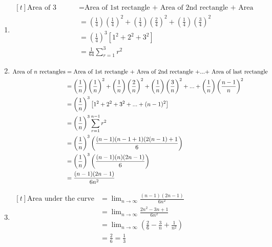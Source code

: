 \documentclass[11pt,a4paper]{book}
\begin{document}
\begin{example}
\begin{enumerate}[label=(\alph*)]

\item
$
\begin{aligned}[t]
\text{Area of 3 rectangles} & =\text{Area of 1st rectangle + Area of 2nd rectangle + Area of 3rd rectangle}\\
 & ={\displaystyle \left(\frac{1}{4}\right)\left(\frac{1}{4}\right)^{2}+\left(\frac{1}{4}\right)\left(\frac{2}{4}\right)^{2}+\left(\frac{1}{4}\right)\left(\frac{3}{4}\right)^{2}}\\
 & ={\displaystyle \left(\frac{1}{4}\right)^{3}\left[1^{2}+2^{2}+3^{2}\right]}\\
 & =\frac{1}{64}\sum_{r=1}^{3}r^{2}
\end{aligned}
$

\item
$
\begin{aligned}[t]
\text{Area of \ensuremath{n} rectangles} & =\text{Area of 1st rectangle + Area of 2nd rectangle +...+ Area of last rectangle }\\
 & =\left(\frac{1}{n}\right)\left(\frac{1}{n}\right)^{2}+\left(\frac{1}{n}\right)\left(\frac{2}{n}\right)^{2}+\left(\frac{1}{n}\right)\left(\frac{3}{n}\right)^{2}+...+\left(\frac{1}{n}\right)\left(\frac{n-1}{n}\right)^{2}\\
 & =\left(\frac{1}{n}\right)^{3}\left[1^{2}+2^{2}+3^{2}+...+(n-1)^{2}\right]\\
 & =\left(\frac{1}{n}\right)^{3}\sum_{r=1}^{n-1}r^{2}\\
 & =\left(\frac{1}{n}\right)^{3}\left(\frac{(n-1)(n-1+1)(2(n-1)+1}{6}\right)\\
 & =\left(\frac{1}{n}\right)^{3}\left(\frac{(n-1)(n)(2n-1)}{6}\right)\\
 & =\frac{(n-1)(2n-1)}{6n^{2}}
\end{aligned}
$

\item
$
\begin{aligned}[t]
\text{Area under the curve} & =\lim_{n\rightarrow\infty}\frac{(n-1)(2n-1)}{6n^{2}}\\
 & =\lim_{n\rightarrow\infty}\frac{2n^{2}-3n+1}{6n^{2}}\\
 & =\lim_{n\rightarrow\infty}\left(\frac{2}{6}-\frac{3}{n}+\frac{1}{n^{2}}\right)\\
 & =\frac{2}{6}=\frac{1}{3}
\end{aligned}
$

\end{enumerate}

\end{example}
\end{document}
